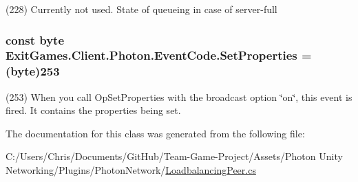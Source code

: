 (228) Currently not used. State of queueing in case of server-\/full

\subsubsection[{\texorpdfstring{Set\+Properties}{SetProperties}}]{\setlength{\rightskip}{0pt plus 5cm}const byte Exit\+Games.\+Client.\+Photon.\+Event\+Code.\+Set\+Properties = (byte)253}\hypertarget{class_exit_games_1_1_client_1_1_photon_1_1_event_code_a922342a5a2475fccf3e2eb887059d7bf}{}\label{class_exit_games_1_1_client_1_1_photon_1_1_event_code_a922342a5a2475fccf3e2eb887059d7bf}


(253) When you call Op\+Set\+Properties with the broadcast option \char`\"{}on\char`\"{}, this event is fired. It contains the properties being set.



The documentation for this class was generated from the following file\+:\begin{DoxyCompactItemize}
\item 
C\+:/\+Users/\+Chris/\+Documents/\+Git\+Hub/\+Team-\/\+Game-\/\+Project/\+Assets/\+Photon Unity Networking/\+Plugins/\+Photon\+Network/\hyperlink{_loadbalancing_peer_8cs}{Loadbalancing\+Peer.\+cs}\end{DoxyCompactItemize}
